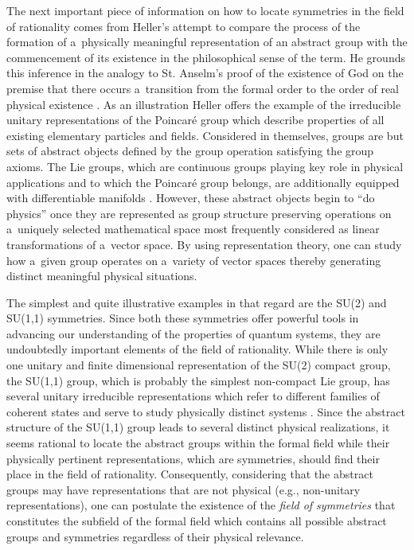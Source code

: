 The next important piece of information on how to locate symmetries in the field of rationality comes from Heller's attempt to compare the process of the formation of a~physically meaningful representation of an abstract group with the commencement of its existence in the philosophical sense of the term. He grounds this inference in the analogy to St. Anselm's proof of the existence of God on the premise that there occurs a~transition from the formal order to the order of real physical existence 
\parencite[][p.63]{heller_teilhards_2003}. %
 As an illustration Heller offers the example of the irreducible unitary representations of the Poincaré group which describe properties of all existing elementary particles and fields. Considered in themselves, groups are but sets of abstract objects defined by the group operation satisfying the group axioms. The Lie groups, which are continuous groups playing key role in physical applications and to which the Poincaré group belongs, are additionally equipped with differentiable manifolds 
\parencite[e.g][pp.47–54]{schwichtenberg_physics_2018}. %
 However, these abstract objects begin to ``do physics'' once they are represented as group structure preserving operations on a~uniquely selected mathematical space most frequently considered as linear transformations of a~vector space. By using representation theory, one can study how a~given group operates on a~variety of vector spaces thereby generating distinct meaningful physical situations.



The simplest and quite illustrative examples in that regard are the SU(2) and SU(1,1) symmetries. Since both these symmetries offer powerful tools in advancing our understanding of the properties of quantum systems, they are undoubtedly important elements of the field of rationality. While there is only one unitary and finite dimensional representation of the SU(2) compact group, the SU(1,1) group, which is probably the simplest non-compact Lie group, has several unitary irreducible representations which refer to different families of coherent states and serve to study physically distinct systems 
\parencite[e.g][]{vourdas_analytic_2006}. %
 Since the abstract structure of the SU(1,1) group leads to several distinct physical realizations, it seems rational to locate the abstract groups within the formal field while their physically pertinent representations, which are symmetries, should find their place in the field of rationality. Consequently, considering that the abstract groups may have representations that are not physical (e.g., non-unitary representations), one can postulate the existence of the \textit{field of symmetries} that constitutes the subfield of the formal field which contains all possible abstract groups and symmetries regardless of their physical relevance.



